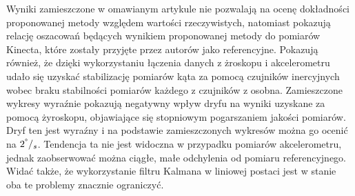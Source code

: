 Wyniki zamieszczone w omawianym artykule \cite{Bo2011a} nie pozwalają na ocenę dokładności proponowanej metody względem wartości rzeczywistych, natomiast pokazują relację oszacowań będących wynikiem proponowanej metody do pomiarów Kinecta, które zostały przyjęte przez autorów jako referencyjne. Pokazują również, że dzięki wykorzystaniu łączenia danych z żroskopu i akcelerometru udało się uzyskać stabilizację pomiarów kąta za pomocą czujników inercyjnych wobec braku stabilności pomiarów każdego z czujników z osobna. Zamieszczone wykresy wyraźnie pokazują negatywny wpływ dryfu na wyniki uzyskane za pomocą żyroskopu, objawiające się stopniowym pogarszaniem jakości pomiarów. Dryf ten jest wyraźny i na podstawie zamieszczonych wykresów można go ocenić na $2^\degree/_s$. Tendencja ta nie jest widoczna w przypadku pomiarów akcelerometru, jednak zaobserwować można ciągłe, małe odchylenia od pomiaru referencyjnego. Widać także, że wykorzystanie filtru Kalmana w liniowej postaci jest w stanie oba te problemy znacznie ograniczyć.\\
		
